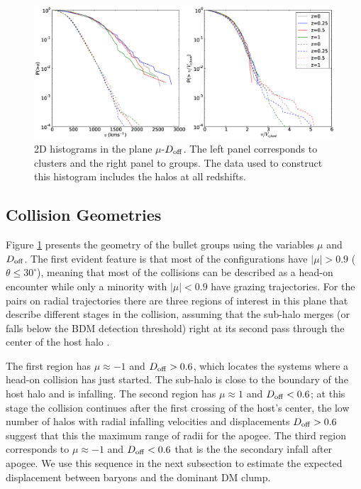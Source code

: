 \documentclass{emulateapj}
\begin{document}
\begin{figure}
\begin{center}
\includegraphics[width=1.0\textwidth]{figure_3.eps}
\end{center}
\caption{2D histograms in the plane $\mu$-$D_{\rm off}$. The left
  panel corresponds to clusters and the right panel to groups. The data
  used to construct this histogram includes the halos at all redshifts.}
\label{fig:geometry}
\end{figure}



\subsection{Collision Geometries}
\label{sec:geometry}

Figure \ref{fig:geometry} presents the geometry of the bullet groups using the 
variables $\mu$ and $D_{\rm off}$. The first evident feature is that
most of the configurations have $|\mu|>0.9$ ($\theta\leq 30^{\circ}$),
meaning that most of the collisions can be described as a head-on
encounter while only a minority with $|\mu|<0.9$ have grazing
trajectories. For the pairs on radial trajectories there are three
regions of interest in this plane that describe different stages in
the collision, assuming that the sub-halo merges (or falls below the
BDM detection threshold) right at its second pass through the center
of the host halo \citep{Poole2006}.  


The first region has $\mu\approx-1$ and $D_{\rm off}>0.6$, which
locates the systems where a head-on collision has just started. The
sub-halo is close to the boundary of the host halo and is
infalling. The second region has $\mu\approx 1$ and $D_{\rm off}<0.6$;
at this stage the collision continues after the first crossing of the
host's center, the low number of halos with radial infalling velocities
and displacements $D_{\rm off}>0.6$ suggest that this the maximum
range of radii for the apogee.  The third region corresponds to
$\mu\approx-1$ and $D_{\rm off}<0.6$ that is the the
secondary infall after apogee. We use this sequence in the next
subsection to estimate the expected displacement between baryons and
the dominant DM clump. 
\end{document}
